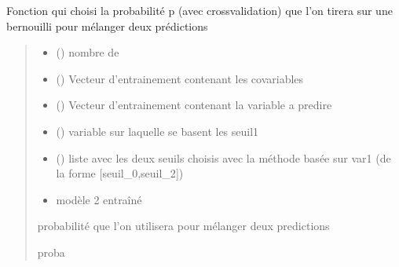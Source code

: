 \documentclass[letterpaper,10pt,french]{sphinxmanual}
\begin{document}

\begin{fulllineitems}
\label{\detokenize{methode_fait_maison:methode_fait_maison.melange}}
\pysigstartsignatures
{}
\pysigstopsignatures
\sphinxAtStartPar
Fonction qui choisi la probabilité p (avec cross\sphinxhyphen{}validation) que l’on tirera sur une bernouilli pour mélanger deux prédictions
\begin{quote}\begin{description}
\begin{itemize}
\item {} 
\sphinxAtStartPar
{} () \textendash{} nombre de

\item {} 
\sphinxAtStartPar
{} () \textendash{} Vecteur d’entrainement contenant les co\sphinxhyphen{}variables

\item {} 
\sphinxAtStartPar
{} () \textendash{} Vecteur d’entrainement contenant la variable a predire

\item {} 
\sphinxAtStartPar
{} () \textendash{} variable sur laquelle se basent les seuil1

\item {} 
\sphinxAtStartPar
{} () \textendash{} liste avec les deux seuils choisis avec la méthode basée sur var1 (de la forme {[}seuil\_0,seuil\_2{]})

\item {} 
\sphinxAtStartPar
{} \textendash{} modèle 2 entraîné

\end{itemize}

\sphinxAtStartPar
probabilité que l’on utilisera pour mélanger deux predictions

\sphinxAtStartPar
proba

\end{description}\end{quote}

\end{fulllineitems}
\end{document}
